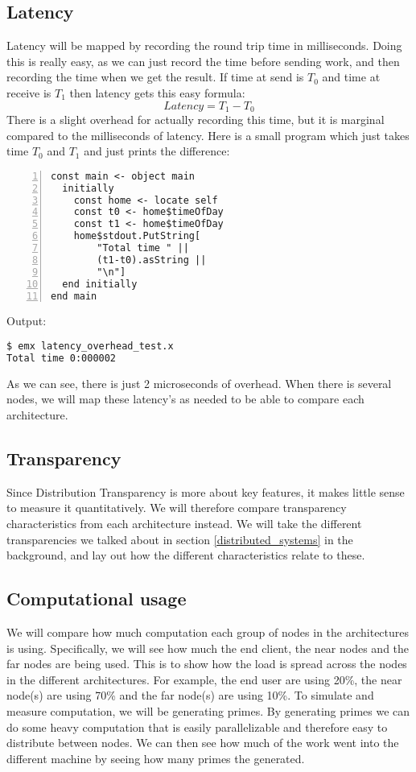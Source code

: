 \subsection{Latency}
Latency will be mapped by recording the round trip time in milliseconds. Doing this is really easy, as we can just record the time before sending work, and then recording the time when we get the result. If time at send is $T_0$ and time at receive is $T_1$ then latency gets this easy formula:
\[Latency=T_1-T_0\]
There is a slight overhead for actually recording this time, but it is marginal compared to the milliseconds of latency. Here is a small program which just takes time $T_0$ and $T_1$ and just prints the difference:
\begin{lstlisting}[language=emerald, numbers=left]
const main <- object main
  initially
    const home <- locate self
    const t0 <- home$timeOfDay
    const t1 <- home$timeOfDay
    home$stdout.PutString[
        "Total time " || 
        (t1-t0).asString ||
        "\n"]
  end initially
end main
\end{lstlisting}
Output:
\begin{lstlisting}[language=Bash]
$ emx latency_overhead_test.x
Total time 0:000002
\end{lstlisting}
As we can see, there is just 2 microseconds of overhead.
When there is several nodes, we will map these latency's as needed to be able to compare each architecture.


\subsection{Transparency}
Since Distribution Transparency is more about key features, it makes little sense to measure it quantitatively. We will therefore compare transparency characteristics from each architecture instead. We will take the different transparencies we talked about in section \ref{distributed_systems} in the background, and lay out how the different characteristics relate to these.


\subsection{Computational usage}
We will compare how much computation each group of nodes in the architectures is using. Specifically, we will see how much the end client, the near nodes and the far nodes are being used. This is to show how the load is spread across the nodes in the different architectures. For example, the end user are using 20\%, the near node(s) are using 70\% and the far node(s) are using 10\%.
To simulate and measure computation, we will be generating primes. By generating primes we can do some heavy computation that is easily parallelizable and therefore easy to distribute between nodes. We can then see how much of the work went into the different machine by seeing how many primes the generated.

